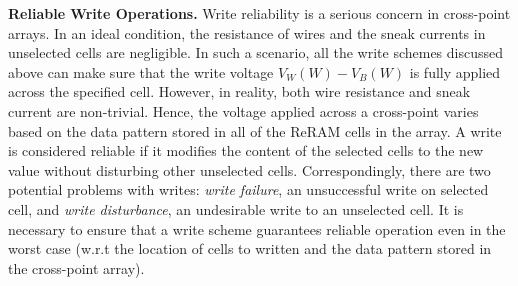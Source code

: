 \vspace{5pt}\noindent\textbf{Reliable Write Operations.}
Write reliability is a serious concern in cross-point arrays. In an ideal
condition, the resistance of wires and the sneak currents in unselected
cells are negligible. In such a scenario, all the write schemes discussed
above can make sure that the write voltage $V_W(W)-V_B(W)$ is fully
applied across the specified cell. However, in reality, both wire
resistance and sneak current are non-trivial. Hence, the voltage applied
across a cross-point varies based on the data pattern stored in all of the
ReRAM cells in the array. A write is considered reliable if it modifies
the content of the selected cells to the new value without disturbing
other unselected cells.
Correspondingly, there are two potential problems with writes: \emph{write
failure}, an unsuccessful write on selected cell, and \emph{write
disturbance}, an undesirable write to an unselected cell. It is necessary to ensure that a write scheme guarantees reliable operation even in the worst case (w.r.t the location of cells to written and the data pattern stored in the cross-point array).


